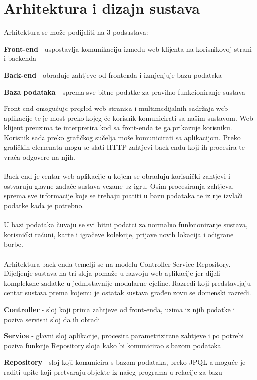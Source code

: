 \chapter{Arhitektura i dizajn sustava}

	Arhitektura se može podijeliti na 3 podsustava:

	\begin{packed_item}

		\item \textbf{Front-end} - uspostavlja komunikaciju između web-klijenta na korisnikovoj strani i backenda
		\item \textbf{Back-end} - obrađuje zahtjeve od frontenda i izmjenjuje bazu podataka
		\item \textbf{Baza podataka} - sprema sve bitne podatke za pravilno funkcioniranje sustava

	\end{packed_item}

	\bigskip
	\noindent Front-end omogućuje pregled web-stranica i multimedijalnih sadržaja web aplikacije te je most preko kojeg će korisnik komunicirati sa našim sustavom. Web klijent preuzima te interpretira kod sa front-enda te ga prikazuje korisniku. Korisnik sada preko grafičkog sučelja može komunicirati sa aplikacijom. Preko grafičkih elemenata mogu se slati HTTP zahtjevi back-endu koji ih procesira te vraća odgovore na njih.\\
	\\
	Back-end je centar web-aplikacije u kojem se obrađuju korisnički zahtjevi i ostvaruju glavne zadaće sustava vezane uz igru. Osim procesiranja zahtjeva, sprema sve informacije koje se trebaju pratiti u bazu podataka te iz nje izvlači podatke kada je potrebno.\\
	\\
	U bazi podataka čuvaju se svi bitni podatci za normalno funkcioniranje sustava, korisnički računi, karte i igračeve kolekcije, prijave novih lokacija i odigrane borbe.\\
	\\
	Arhitektura back-enda temelji se na modelu Controller-Service-Repository. Dijeljenje sustava na tri sloja pomaže u razvoju web-aplikacije jer dijeli kompleksne zadatke u jednostavnije modularne cjeline. Razredi koji predstavljaju centar sustava prema kojemu je ostatak sustava građen zovu se domenski razredi.\\

	\begin{packed_item}
		\item \textbf{Controller} - sloj koji prima zahtjeve od front-enda, uzima iz njih podatke i poziva servisni sloj da ih obradi
		\item \textbf{Service} - glavni sloj aplikacije, procesira parametrizirane zahtjeve i po potrebi poziva funkcije Repository sloja kako bi komunicirao s bazom podataka
		\item \textbf{Repository} - sloj koji komunicira s bazom podataka, preko JPQL-a moguće je raditi upite koji pretvaraju objekte iz našeg programa u relacije za bazu

	\end{packed_item}

